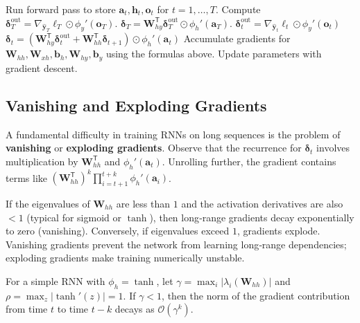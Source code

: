 \documentclass{tufte-handout}
\begin{document}
\begin{algorithm}[h]
    \caption{Backpropagation Through Time (BPTT)}
    \begin{algorithmic}[1]
        \State Run forward pass to store $\mathbf{a}_t, \mathbf{h}_t, \mathbf{o}_t$ for $t=1,\dots,T$.
        \State Compute $\boldsymbol{\delta}_T^{\text{out}} = \nabla_{\hat{\mathbf{y}}_T}\ell_T \odot \phi_y'(\mathbf{o}_T)$.
        \State $\boldsymbol{\delta}_T = \mathbf{W}_{hy}^{\mathsf{T}} \boldsymbol{\delta}_T^{\text{out}} \odot \phi_h'(\mathbf{a}_T)$.
            \State $\boldsymbol{\delta}_t^{\text{out}} = \nabla_{\hat{\mathbf{y}}_t}\ell_t \odot \phi_y'(\mathbf{o}_t)$
            \State $\boldsymbol{\delta}_t = \left( \mathbf{W}_{hy}^{\mathsf{T}} \boldsymbol{\delta}_t^{\text{out}} + \mathbf{W}_{hh}^{\mathsf{T}} \boldsymbol{\delta}_{t+1} \right) \odot \phi_h'(\mathbf{a}_t)$
        \EndFor
        \State Accumulate gradients for $\mathbf{W}_{hh}, \mathbf{W}_{xh}, \mathbf{b}_h, \mathbf{W}_{hy}, \mathbf{b}_y$ using the formulas above.
        \State Update parameters with gradient descent.
    \end{algorithmic}
\end{algorithm}

\subsection{Vanishing and Exploding Gradients}

A fundamental difficulty in training RNNs on long sequences is the problem of \textbf{vanishing} or \textbf{exploding gradients}. Observe that the recurrence for $\boldsymbol{\delta}_t$ involves multiplication by $\mathbf{W}_{hh}^{\mathsf{T}}$ and $\phi_h'(\mathbf{a}_t)$. Unrolling further, the gradient contains terms like $(\mathbf{W}_{hh}^{\mathsf{T}})^k \prod_{i=t+1}^{t+k} \phi_h'(\mathbf{a}_i)$. 

If the eigenvalues of $\mathbf{W}_{hh}$ are less than $1$ and the activation derivatives are also $<1$ (typical for sigmoid or $\tanh$), then long‑range gradients decay exponentially to zero (vanishing). Conversely, if eigenvalues exceed $1$, gradients explode. Vanishing gradients prevent the network from learning long‑range dependencies; exploding gradients make training numerically unstable.

\begin{thm}
    For a simple RNN with $\phi_h = \tanh$, let $\gamma = \max_i |\lambda_i(\mathbf{W}_{hh})|$ and $\rho = \max_z |\tanh'(z)| = 1$. If $\gamma < 1$, then the norm of the gradient contribution from time $t$ to time $t-k$ decays as $\mathcal{O}(\gamma^k)$.
\end{thm}
\end{document}
